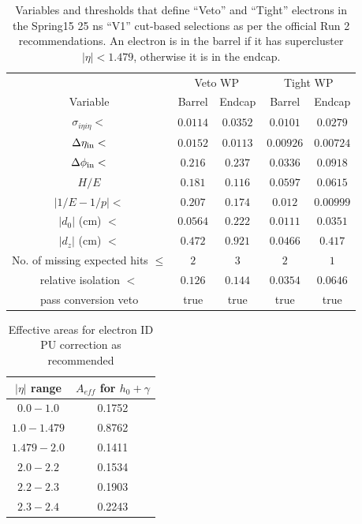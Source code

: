 \begin{table}[!ht]
\centering
\begin{tabular}{|c|c|c|c|c|}
\hline
  & \multicolumn{2}{|c|}{Veto WP} & \multicolumn{2}{|c|}{Tight WP} \\
  Variable                                                  & Barrel     & Endcap     & Barrel     & Endcap     \\
\hline
  $\sigma_{i\eta i\eta} <$               		& $0.0114$ & $0.0352$ & $0.0101$ & $0.0279$ \\
  $\Delta\eta_{\mbox{\scriptsize{in}}} <$ 	& $0.0152$ & $0.0113$ & $0.00926$   & $0.00724$ \\
  $\Delta\phi_{\mbox{\scriptsize{in}}} <$ 	& $0.216$   & $0.237$ &   $0.0336  $ & $0.0918$ \\
  $H/E$                                   			& $0.181$   & $0.116$ &   $0.0597  $ & $0.0615$ \\
  $|1/E - 1/p| <$                         			& $0.207$   & $0.174$ &   $0.012$ & $0.00999$ \\
  $|d_0|$ (cm) $<$                     			& $0.0564$ & $0.222$ &   $0.0111$ & $0.0351$ \\
  $|d_z|$ (cm) $<$                     			& $0.472$   & $0.921$ &   $0.0466$ & $0.417$ \\
  No. of missing expected hits $\leq$      & $2$           & $3$        &   $2$              & $1$        \\
  relative isolation $<$                             & $0.126$ & $0.144$ & $0.0354$ & $0.0646$ \\
  pass conversion veto                             & true       & true       & true       & true       \\
\hline
\end{tabular}
\caption{Variables and thresholds that define ``Veto'' and ``Tight'' electrons in the Spring15 25 ns ``V1'' cut-based selections \cite{electron} as per the official Run 2 recommendations. An electron is in the barrel if it has supercluster $|\eta|<1.479$, otherwise it is in the endcap.}
\label{tab:ele_wp}
\end{table}

\begin{table}[!ht]
\centering
\begin{tabular}{|c|c|}
\hline
$|\eta|$ range          &  $A_{eff}$ for $h_{0} + \gamma$ \\
\hline
$ 0.0 - 1.0$              &  0.1752 \\
\hline
$ 1.0 - 1.479$           &  0.8762 \\
\hline
$1.479 - 2.0$            &  0.1411 \\
\hline
$2.0 - 2.2$                & 0.1534 \\
\hline
$2.2 - 2.3$                & 0.1903 \\
\hline
$2.3 - 2.4$                & 0.2243 \\
\hline
\end{tabular}
\caption{Effective areas for electron ID PU correction as recommended \cite{EA}}
\label{tab:ea}
\end{table}

